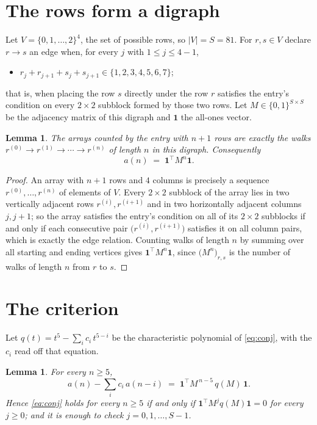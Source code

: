 \documentclass[11pt,a4paper]{article}
\theoremstyle{plain}
\newtheorem{lemma}[theorem]{Lemma}
\theoremstyle{definition}
\begin{document}
\section{The rows form a digraph}

Let $V=\{0,1,\dots,2\}^{4}$, the set of possible rows, so $|V|=S=81$. For
$r,s\in V$ declare $r\to s$ an edge when, for every $j$ with $1\le j\le 4-1$,
\begin{itemize}
\item $r_j+r_{j+1}+s_j+s_{j+1}\in\{1, 2, 3, 4, 5, 6, 7\}$;

\end{itemize}
that is, when placing the row $s$ directly under the row $r$ satisfies the entry's
condition on every $2\times2$ subblock formed by those two rows. Let $M\in\{0,1\}^{S\times
S}$ be the adjacency matrix of this digraph and $\mathbf{1}$ the all-ones vector.

\begin{lemma}\label{lem:walk}
The arrays counted by the entry with $n+1$ rows are exactly the walks
$r^{(0)}\to r^{(1)}\to\cdots\to r^{(n)}$ of length $n$ in this digraph. Consequently
\[
a(n)\;=\;\mathbf{1}^{\!\top}M^{n}\mathbf{1} .
\]
\end{lemma}

\begin{proof}
An array with $n+1$ rows and $4$ columns is precisely a sequence
$r^{(0)},\dots,r^{(n)}$ of elements of $V$. Every $2\times2$ subblock of the array lies
in two vertically adjacent rows $r^{(i)},r^{(i+1)}$ and in two horizontally adjacent
columns $j,j+1$; so the array satisfies the entry's condition on all of its $2\times2$
subblocks if and only if each consecutive pair $\bigl(r^{(i)},r^{(i+1)}\bigr)$ satisfies
it on all column pairs, which is exactly the edge relation. Counting walks of length $n$ by
summing over all starting and ending vertices gives
$\mathbf{1}^{\!\top}M^{n}\mathbf{1}$, since
$\bigl(M^{n}\bigr)_{r,s}$ is the number of walks of length $n$ from $r$ to $s$.
\end{proof}

\section{The criterion}

Let $q(t)=t^{5}-\sum_{i}c_i\,t^{5-i}$ be the characteristic polynomial of
\eqref{eq:conj}, with the $c_i$ read off that equation.

\begin{lemma}\label{lem:crit}
For every $n\ge5$,
\[
a(n)-\sum_i c_i\,a(n-i)\;=\;\mathbf{1}^{\!\top}M^{\,n-5}\,q(M)\,\mathbf{1} .
\]
Hence \eqref{eq:conj} holds for every $n\ge5$ if and only if
$\mathbf{1}^{\!\top}M^{j}q(M)\mathbf{1}=0$ for every $j\ge0$; and it is enough to
check $j=0,1,\dots,S-1$.
\end{lemma}
\end{document}

